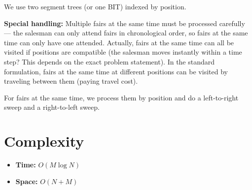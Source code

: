 \documentclass[11pt,a4paper]{article}
\begin{document}
We use two segment trees (or one BIT) indexed by position.

\textbf{Special handling:} Multiple fairs at the same time must be processed carefully --- the salesman can only attend fairs in chronological order, so fairs at the same time can only have one attended. Actually, fairs at the same time can all be visited if positions are compatible (the salesman moves instantly within a time step? This depends on the exact problem statement). In the standard formulation, fairs at the same time at different positions can be visited by traveling between them (paying travel cost).

For fairs at the same time, we process them by position and do a left-to-right sweep and a right-to-left sweep.

\section{Complexity}
\begin{itemize}
    \item \textbf{Time:} $O(M \log N)$
    \item \textbf{Space:} $O(N + M)$
\end{itemize}
\end{document}
